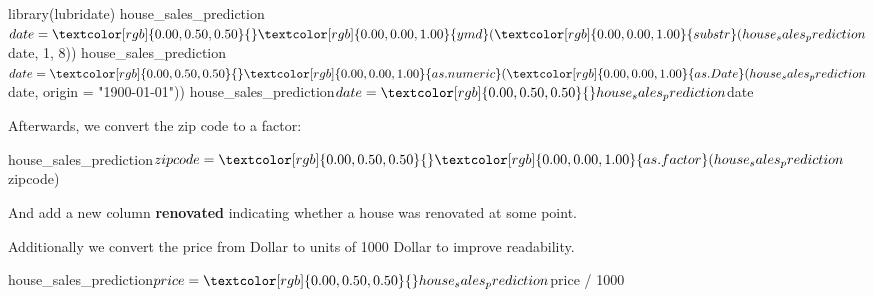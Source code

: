 \documentclass[]{article}
\newenvironment{Shaded}{}{}
\newcommand{\CommentTok}[1]{\textcolor[rgb]{0.00,0.50,0.00}{#1}}
\newcommand{\DataTypeTok}[1]{#1}
\newcommand{\DecValTok}[1]{#1}
\newcommand{\KeywordTok}[1]{\textcolor[rgb]{0.00,0.00,1.00}{#1}}
\newcommand{\NormalTok}[1]{#1}
\newcommand{\OperatorTok}[1]{#1}
\newcommand{\OtherTok}[1]{\textcolor[rgb]{1.00,0.25,0.00}{#1}}
\newcommand{\StringTok}[1]{\textcolor[rgb]{0.00,0.50,0.50}{#1}}
\renewenvironment{Shaded} {\begin{snugshade}\small} {\end{snugshade}}
\begin{document}
\begin{Shaded}
\begin{Highlighting}[]
\KeywordTok{library}\NormalTok{(lubridate)}
\NormalTok{house_sales_prediction}\OperatorTok{$}\NormalTok{date =}\StringTok{ }\KeywordTok{ymd}\NormalTok{(}\KeywordTok{substr}\NormalTok{(house_sales_prediction}\OperatorTok{$}\NormalTok{date, }\DecValTok{1}\NormalTok{, }\DecValTok{8}\NormalTok{))}
\NormalTok{house_sales_prediction}\OperatorTok{$}\NormalTok{date =}\StringTok{ }\KeywordTok{as.numeric}\NormalTok{(}\KeywordTok{as.Date}\NormalTok{(house_sales_prediction}\OperatorTok{$}\NormalTok{date, }\DataTypeTok{origin =} \StringTok{"1900-01-01"}\NormalTok{))}
\NormalTok{house_sales_prediction}\OperatorTok{$}\NormalTok{date =}\StringTok{ }\NormalTok{house_sales_prediction}\OperatorTok{$}\NormalTok{date}
\end{Highlighting}
\end{Shaded}

Afterwards, we convert the zip code to a factor:

\begin{Shaded}
\begin{Highlighting}[]
\NormalTok{house_sales_prediction}\OperatorTok{$}\NormalTok{zipcode =}\StringTok{ }\KeywordTok{as.factor}\NormalTok{(house_sales_prediction}\OperatorTok{$}\NormalTok{zipcode)}
\end{Highlighting}
\end{Shaded}

And add a new column \textbf{renovated} indicating whether a house was renovated at some point.

\begin{Shaded}
\end{Shaded}

Additionally we convert the price from Dollar to units of 1000 Dollar to improve readability.

\begin{Shaded}
\begin{Highlighting}[]
\NormalTok{house_sales_prediction}\OperatorTok{$}\NormalTok{price =}\StringTok{ }\NormalTok{house_sales_prediction}\OperatorTok{$}\NormalTok{price }\OperatorTok{/}\StringTok{ }\DecValTok{1000}
\end{Highlighting}
\end{Shaded}
\end{document}
